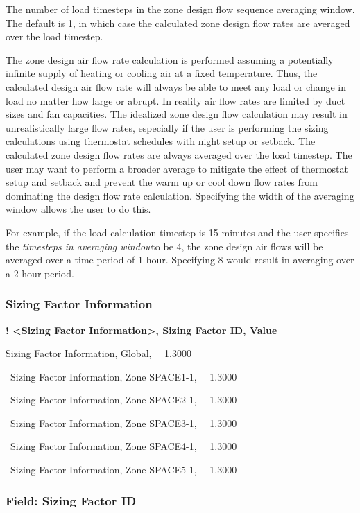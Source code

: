 The number of load timesteps in the zone design flow sequence averaging window. The default is 1, in which case the calculated zone design flow rates are averaged over the load timestep.

The zone design air flow rate calculation is performed assuming a potentially infinite supply of heating or cooling air at a fixed temperature. Thus, the calculated design air flow rate will always be able to meet any load or change in load no matter how large or abrupt. In reality air flow rates are limited by duct sizes and fan capacities. The idealized zone design flow calculation may result in unrealistically large flow rates, especially if the user is performing the sizing calculations using thermostat schedules with night setup or setback. The calculated zone design flow rates are always averaged over the load timestep. The user may want to perform a broader average to mitigate the effect of thermostat setup and setback and prevent the warm up or cool down flow rates from dominating the design flow rate calculation. Specifying the width of the averaging window allows the user to do this.

For example, if the load calculation timestep is 15 minutes and the user specifies the \emph{timesteps in averaging window}to be 4, the zone design air flows will be averaged over a time period of 1 hour. Specifying 8 would result in averaging over a 2 hour period.

\subsubsection{Sizing Factor Information}\label{sizing-factor-information}

\textbf{! \textless{}Sizing Factor Information\textgreater{}, Sizing Factor ID, Value}

Sizing Factor Information, Global,~~ 1.3000

~Sizing Factor Information, Zone SPACE1-1,~~ 1.3000

~Sizing Factor Information, Zone SPACE2-1,~~ 1.3000

~Sizing Factor Information, Zone SPACE3-1,~~ 1.3000

~Sizing Factor Information, Zone SPACE4-1,~~ 1.3000

~Sizing Factor Information, Zone SPACE5-1,~~ 1.3000

\subsubsection{Field: Sizing Factor ID}\label{field-sizing-factor-id}

